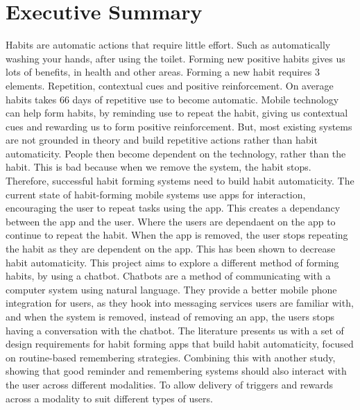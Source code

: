 
\section{Executive Summary}

Habits are automatic actions that require little effort. Such as automatically washing your hands, after using the toilet. Forming new positive habits gives us lots of benefits, in health and other areas. Forming a new habit requires 3 elements. Repetition, contextual cues and positive reinforcement. On average habits takes 66 days of repetitive use to become automatic.\newline
\newline
Mobile technology can help form habits, by reminding use to repeat the habit, giving us contextual cues and rewarding us to form positive reinforcement. But, most existing systems are not grounded in theory and build repetitive actions rather than habit automaticity. People then become dependent on the technology, rather than the habit. This is bad because when we remove the system, the habit stops. Therefore, successful habit forming systems need to build habit automaticity.\newline
\newline
The current state of habit-forming mobile systems use apps for interaction, encouraging the user to repeat tasks using the app. This creates a dependancy between the app and the user. Where the users are dependaent on the app to continue to repeat the habit. When the app is removed, the user stops repeating the habit as they are dependent on the app. This has been shown to decrease habit automaticity.\newline
\newline
This project aims to explore a different method of forming habits, by using a chatbot.\newline
Chatbots are a method of communicating with a computer system using natural language. They provide a better mobile phone integration for users, as they hook into messaging services users are familiar with, and when the system is removed, instead of removing an app, the users stops having a conversation with the chatbot.\newline
\newline
The literature presents us with a set of design requirements for habit forming apps that build habit automaticity, focused on routine-based remembering strategies. Combining this with another study, showing that good reminder and remembering systems should also interact with the user across different modalities. To allow delivery of triggers and rewards across a modality to suit different types of users.\newline
